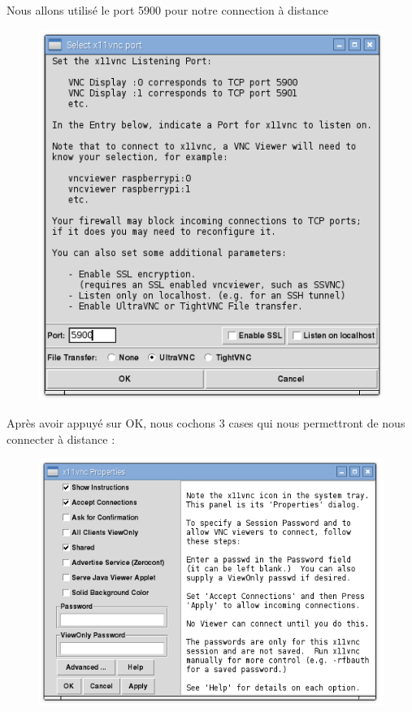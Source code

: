 \documentclass[a4paper,11pt]{report}
\begin{document}
			\newline Nous allons utilisé le port 5900 pour notre connection à distance
			\begin{figure}[!h]
				\begin{center}
					\includegraphics[scale=0.5]{Illustrations/4.png}
				\end{center}
			\end{figure}
			\newline Après avoir appuyé sur OK, nous cochons 3 cases qui nous permettront de nous connecter à distance :
			\begin{figure}[!h]
				\begin{center}
					\includegraphics[scale=0.5]{Illustrations/5.png}
				\end{center}
			\end{figure}
\end{document}
